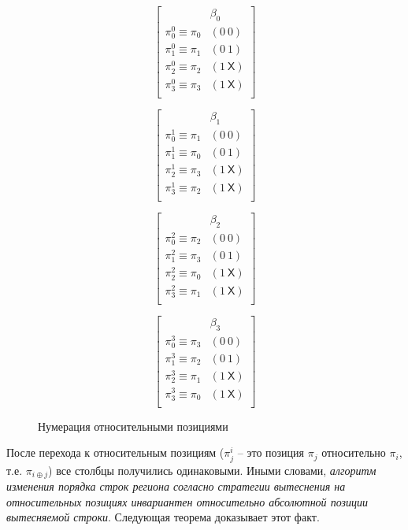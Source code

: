 \begin{figure}[h]
\parbox{0.24\textwidth}{
$$ \left[
  \begin{array}{c|c}
          & \beta_0 \\ \hline
    \pi^0_0 \equiv \pi_0 & (0~0) \\
    \pi^0_1 \equiv \pi_1 & (0~1) \\
    \pi^0_2 \equiv \pi_2 & (1~\textsf{X}) \\
    \pi^0_3 \equiv \pi_3 & (1~\textsf{X}) \\
  \end{array}
\right]
$$
}\parbox{0.24\textwidth}{
$$ \left[
  \begin{array}{c|c}
          & \beta_1 \\ \hline
    \pi^1_0 \equiv \pi_1 & (0~0) \\
    \pi^1_1 \equiv \pi_0 & (0~1) \\
    \pi^1_2 \equiv \pi_3 & (1~\textsf{X}) \\
    \pi^1_3 \equiv \pi_2 & (1~\textsf{X}) \\
  \end{array}
\right]
$$
}\parbox{0.24\textwidth}{
$$ \left[
  \begin{array}{c|c}
          & \beta_2 \\ \hline
    \pi^2_0 \equiv \pi_2 & (0~0) \\
    \pi^2_1 \equiv \pi_3 & (0~1) \\
    \pi^2_2 \equiv \pi_0 & (1~\textsf{X}) \\
    \pi^2_3 \equiv \pi_1 & (1~\textsf{X}) \\
  \end{array}
\right]
$$
}\parbox{0.24\textwidth}{
$$ \left[
  \begin{array}{c|c}
          & \beta_3 \\ \hline
    \pi^3_0 \equiv \pi_3 & (0~0) \\
    \pi^3_1 \equiv \pi_2 & (0~1) \\
    \pi^3_2 \equiv \pi_1 & (1~\textsf{X}) \\
    \pi^3_3 \equiv \pi_0 & (1~\textsf{X}) \\
  \end{array}
\right]
$$
}
\caption{Нумерация относительными позициями}\label{fig:plru_def_step2}
\end{figure}

После перехода к относительным позициям ($\pi^i_j$ -- это позиция
$\pi_j$ относительно $\pi_i$, т.е. $\pi_{i \oplus j}$) все столбцы получились одинаковыми.
Иными словами, \emph{алгоритм изменения порядка строк региона согласно стратегии
вытеснения \PseudoLRU на относительных позициях инвариантен относительно абсолютной позиции вытесняемой строки}. Следующая теорема доказывает этот факт.

